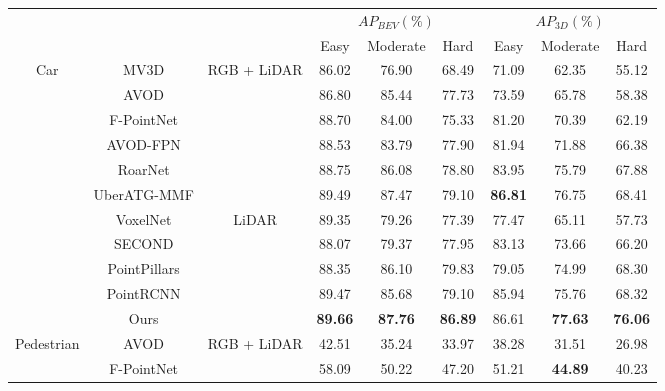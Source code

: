 \documentclass[10pt,twocolumn,letterpaper]{article}
\begin{document}
\begin{table*}[t]
   \centering 
   \footnotesize
   \begin{tabular}{|c|c|c||c|c|c||c|c|c|}
       \hline
       \multicolumn{1}{|c|}{ \multirow{2}{*}{Class}} & \multicolumn{1}{c|}{ \multirow{2}{*}{Method}} & \multicolumn{1}{c||}{ \multirow{2}{*}{Modality}} & \multicolumn{3}{|c||}{$AP_{BEV} (\%)$}& \multicolumn{3}{|c|}{$AP_{3D} (\%)$} \\ \cline{4-9}
       \multicolumn{1}{|c|}{} & \multicolumn{1}{c|}{} & \multicolumn{1}{c||}{} & \multicolumn{1}{|c|}{Easy} & \multicolumn{1}{|c|}{Moderate} & \multicolumn{1}{|c||}{Hard} & \multicolumn{1}{|c|}{Easy} & \multicolumn{1}{|c|}{Moderate} & \multicolumn{1}{|c|}{Hard} \\
       \hline
       \hline
      \multirow {11}{*}{Car} & MV3D \cite{MV3D} & \multirow{6}{*}{RGB + LiDAR}  & 86.02 & 76.90 & 68.49 & 71.09 & 62.35 & 55.12\\
      {} & AVOD \cite{AVOD} & {} & 86.80 &  85.44 & 77.73 & 73.59 & 65.78 & 58.38 \\
      {} & F-PointNet \cite{FPOINTNET} & {} & 88.70 & 84.00 & 75.33 & 81.20 & 70.39 & 62.19 \\ 
      {} & AVOD-FPN \cite{AVOD} & {} & 88.53 & 83.79 &  77.90 &  81.94 & 71.88 &  66.38 \\
      {} & RoarNet \cite{kiwoo2018roar} & {} & 88.75 & 86.08 & 78.80 & 83.95 & 75.79 & 67.88 \\
      {} & UberATG-MMF \cite{Liang2019CVPR} & {} & 89.49 & 87.47 & 79.10 & \bf 86.81 & 76.75 & 68.41 \\ \cline{2-9}
      {} & VoxelNet \cite{VOXELNET} & \multirow{5}{*}{LiDAR} &  89.35 & 79.26 & 77.39 & 77.47 & 65.11 & 57.73 \\
      {} & SECOND \cite{yan2018second} & {} & 88.07  & 79.37 & 77.95 & 83.13 & 73.66 & 66.20 \\
      {} & PointPillars \cite{lang2018pointpillars} & {} & 88.35 & 86.10 & 79.83 & 79.05 & 74.99 & 68.30 \\
      {} & PointRCNN \cite{shi2018pointrcnn} & {} & 89.47 & 85.68 & 79.10 & 85.94 & 75.76 & 68.32 \\
      {} & Ours & {} & \bf 89.66 & \bf 87.76 & \bf 86.89 & 86.61 & \bf 77.63 & \bf 76.06 \\
      \hline
      \hline
      \multirow {8}{*}{Pedestrian} & AVOD \cite{AVOD} & \multirow{3}{*}{RGB + LiDAR} & 42.51 & 35.24 & 33.97 & 38.28 & 31.51 & 26.98 \\
      {} & F-PointNet \cite{FPOINTNET} & {} & 58.09 & 50.22 & 47.20 & 51.21 & \bf 44.89 & 40.23 \\ 

\end{tabular}
\end{table*}
\end{document}
